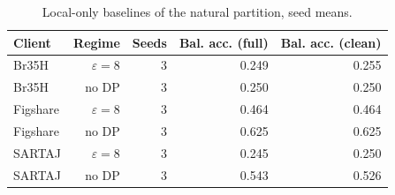 \begin{table}[H]
\centering\footnotesize
\caption{Local-only baselines of the natural partition, seed means.}\label{tab:s_local}
{\begin{tabular}{lrrrr}
\toprule
Client & Regime & Seeds & Bal. acc. (full) & Bal. acc. (clean) \\
\midrule
Br35H & $\varepsilon=8$ & 3 & 0.249 & 0.255 \\
Br35H & no DP & 3 & 0.250 & 0.250 \\
Figshare & $\varepsilon=8$ & 3 & 0.464 & 0.464 \\
Figshare & no DP & 3 & 0.625 & 0.625 \\
SARTAJ & $\varepsilon=8$ & 3 & 0.245 & 0.250 \\
SARTAJ & no DP & 3 & 0.543 & 0.526 \\
\bottomrule
\end{tabular}}
\end{table}

